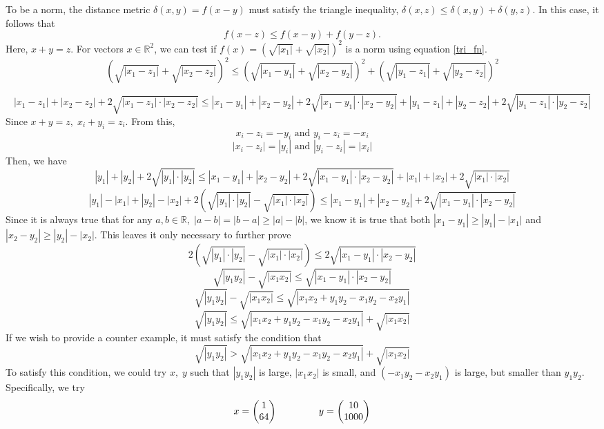 \documentclass{report}
\newcommand{\tab}{\-\hspace{1.5cm}}
\begin{document}
To be a norm, the distance metric $\delta(x,y) = f(x-y)$ must satisfy the triangle inequality, $\delta(x,z) \leq \delta(x,y) + \delta(y,z)$.
In this case, it follows that
\begin{equation}
f(x-z) \leq f(x-y) + f(y-z)
\label{tri_fn}.
\end{equation}
Here, $x + y = z$. For vectors $x \in \mathbb{R}^2$, we can test if $f(x) = (\sqrt{|x_1|} + \sqrt{|x_2|})^2$ is a norm using equation \ref{tri_fn}.
$$ (\sqrt{|x_1-z_1|} + \sqrt{|x_2-z_2|})^2 \leq (\sqrt{|x_1-y_1|} + \sqrt{|x_2-y_2|})^2 + (\sqrt{|y_1-z_1|} + \sqrt{|y_2-z_2|})^2 $$

\begin{equation*}
|x_1-z_1| + |x_2-z_2| + 2\sqrt{|x_1-z_1|\cdot|x_2-z_2|} \leq |x_1-y_1| + |x_2-y_2| + 2\sqrt{|x_1-y_1|\cdot|x_2-y_2|} + |y_1-z_1| + |y_2-z_2| + 2\sqrt{|y_1-z_1|\cdot|y_2-z_2|}
\end{equation*}
Since $x + y = z, \; x_i + y_i = z_i$. From this,
$$ x_i - z_i = -y_i \text{ and } y_i - z_i = -x_i$$
$$ |x_i - z_i| = |y_i| \text{ and } |y_i - z_i| = |x_i|$$
Then, we have 
$$ |y_1| + |y_2| + 2\sqrt{|y_1|\cdot|y_2|} \leq |x_1-y_1| + |x_2-y_2| + 2\sqrt{|x_1-y_1|\cdot|x_2-y_2|} + |x_1| + |x_2| + 2\sqrt{|x_1|\cdot|x_2|} $$
$$ |y_1| - |x_1| + |y_2| - |x_2| + 2(\sqrt{|y_1|\cdot|y_2|} - \sqrt{|x_1|\cdot|x_2|}) \leq |x_1-y_1| + |x_2-y_2| + 2\sqrt{|x_1-y_1|\cdot|x_2-y_2|}$$
Since it is always true that for any $a,b \in \mathbb{R}, \; |a-b| = |b-a| \geq |a|-|b|$, we know it is true that both $|x_1 - y_1| \geq |y_1|-|x_1|$ and $|x_2 - y_2| \geq |y_2|-|x_2|$. This leaves it only necessary to further prove 
$$ 2(\sqrt{|y_1|\cdot|y_2|} - \sqrt{|x_1|\cdot|x_2|}) \leq 2\sqrt{|x_1-y_1|\cdot|x_2-y_2|}$$
$$ \sqrt{|y_1 y_2|} - \sqrt{|x_1 x_2|} \leq \sqrt{|x_1-y_1|\cdot|x_2-y_2|}$$
$$ \sqrt{|y_1 y_2|} - \sqrt{|x_1 x_2|} \leq \sqrt{|x_1 x_2 + y_1 y_2 - x_1 y_2 - x_2 y_1 |}$$
$$ \sqrt{|y_1 y_2|} \leq \sqrt{|x_1 x_2 + y_1 y_2 - x_1 y_2 - x_2 y_1 |} + \sqrt{|x_1 x_2|}$$
If we wish to provide a counter example, it must satisfy the condition that 
$$ \sqrt{|y_1 y_2|} > \sqrt{|x_1 x_2 + y_1 y_2 - x_1 y_2 - x_2 y_1 |} + \sqrt{|x_1 x_2|}$$
To satisfy this condition, we could try $x,\;y$ such that $|y_1 y_2|$ is large, $|x_1 x_2|$ is small, and $(-x_1 y_2 - x_2 y_1)$ is large, but smaller than $y_1 y_2$. Specifically, we try
$$ x = 
\begin{pmatrix}
1\\
64\\
\end{pmatrix}
\tab 
y = 
\begin{pmatrix}
10\\
1000\\
\end{pmatrix}$$
\end{document}
